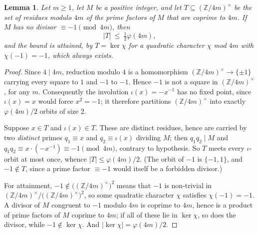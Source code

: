 \documentclass[11pt, a4paper]{article}
\theoremstyle{plain}
\newtheorem{lemma}[theorem]{Lemma}
\theoremstyle{definition}
\newcommand{\Z}{\mathbb{Z}}
\begin{document}
\begin{lemma}\label{lem:involution}
Let $m\ge1$, let $M$ be a positive integer, and let $T\subseteq(\Z/4m)^{\times}$ be the set of residues modulo $4m$ of the prime factors of $M$ that are coprime to $4m$. If $M$ has no divisor $\equiv-1\pmod{4m}$, then
$$|T|\ \le\ \tfrac12\varphi(4m),$$
and the bound is attained, by $T=\ker\chi$ for a quadratic character $\chi$ mod $4m$ with $\chi(-1)=-1$, which always exists.
\end{lemma}
\begin{proof}
Since $4\mid4m$, reduction modulo $4$ is a homomorphism $(\Z/4m)^{\times}\to\{\pm1\}$ carrying every square to $1$ and $-1$ to $-1$. Hence $-1$ is not a square in $(\Z/4m)^{\times}$, for any $m$. Consequently the involution $\iota(x)=-x^{-1}$ has no fixed point, since $\iota(x)=x$ would force $x^{2}=-1$; it therefore partitions $(\Z/4m)^{\times}$ into exactly $\varphi(4m)/2$ orbits of size $2$.

Suppose $x\in T$ and $\iota(x)\in T$. These are distinct residues, hence are carried by two \emph{distinct} primes $q_1\equiv x$ and $q_2\equiv\iota(x)$ dividing $M$; then $q_1q_2\mid M$ and $q_1q_2\equiv x\cdot(-x^{-1})\equiv-1\pmod{4m}$, contrary to hypothesis. So $T$ meets every $\iota$-orbit at most once, whence $|T|\le\varphi(4m)/2$. (The orbit of $-1$ is $\{-1,1\}$, and $-1\notin T$, since a prime factor $\equiv-1$ would itself be a forbidden divisor.)

For attainment, $-1\notin\big((\Z/4m)^{\times}\big)^{2}$ means that $-1$ is non-trivial in $(\Z/4m)^{\times}/\big((\Z/4m)^{\times}\big)^{2}$, so some quadratic character $\chi$ satisfies $\chi(-1)=-1$. A divisor of $M$ congruent to $-1$ modulo $4m$ is coprime to $4m$, hence is a product of prime factors of $M$ coprime to $4m$; if all of these lie in $\ker\chi$, so does the divisor, while $-1\notin\ker\chi$. And $|\ker\chi|=\varphi(4m)/2$.
\end{proof}
\end{document}
